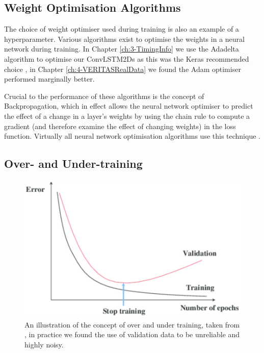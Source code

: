 \subsection{Weight Optimisation Algorithms}
The choice of weight optimiser used during training is also an example of a hyperparameter. Various algorithms exist to optimise the weights in a neural network during training. In Chapter \ref{ch:3-TimingInfo} we use the Adadelta algorithm to optimise our ConvLSTM2Ds as this was the Keras recommended choice \cite{adadelta}, in Chapter \ref{ch:4-VERITASRealData} we found the Adam optimiser \cite{adam} performed marginally better.

Crucial to the performance of these algorithms is the concept of Backpropagation, which in effect allows the neural network optimiser to predict the effect of a change in a layer's weights by using the chain rule to compute a gradient (and therefore examine the effect of changing weights) in the loss function. Virtually all neural network optimisation algorithms use this technique \cite{goodfellow2016deep}.

\subsection{Over- and Under-training}
\begin{figure}[ht] 
        \centering \includegraphics[width=0.7\columnwidth]{figures/overtrain.png}
        \caption{
                \label{fig:earlystop} %
                An illustration of the concept of over and under training, taken from \cite{earlystop}, in practice we found the use of validation data to be unreliable and highly noisy.
        }
\end{figure}

